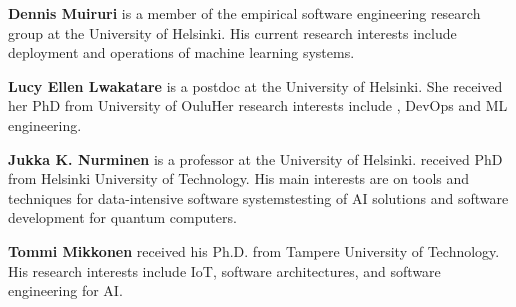 \textbf{Dennis Muiruri} is a member of the empirical software engineering research group at the University of Helsinki. His current research interests include deployment and operations of machine learning systems.

\textbf{Lucy Ellen Lwakatare} is a postdoc at the University of Helsinki. She received her PhD from University of Oulu\DIFdelbegin {}\DIFdelend \DIFaddbegin {}\DIFaddend Her research interests include \DIFdelbegin {}\DIFdelend \DIFaddbegin {}\DIFaddend , DevOps and ML engineering.

\textbf{Jukka K. Nurminen} is a professor at the University of Helsinki. 
\DIFdelbegin {}\DIFdelend %
\DIFaddbegin {}\DIFaddend received PhD from Helsinki University of Technology\DIFdelbegin {}\DIFdelend . His main interests are on tools and techniques for \DIFdelbegin {}\DIFdelend data-intensive software systems\DIFdelbegin {}\DIFdelend \DIFaddbegin \DIFadd{, }\DIFaddend testing of AI solutions \DIFdelbegin {}\DIFdelend and software development for quantum computers.

\textbf{Tommi Mikkonen} \DIFaddbegin {}\DIFaddend received his Ph.D. from Tampere University of Technology\DIFdelbegin {}\DIFdelend . His research interests include IoT, software architectures, and software engineering for AI.

